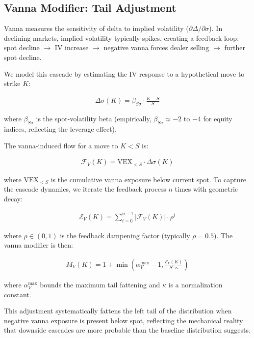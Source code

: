 \documentclass[11pt, a4paper]{article}
\begin{document}
\subsection{Vanna Modifier: Tail Adjustment}

Vanna measures the sensitivity of delta to implied volatility ($\partial \Delta / \partial \sigma$). In declining markets, implied volatility typically spikes, creating a feedback loop: spot decline $\rightarrow$ IV increase $\rightarrow$ negative vanna forces dealer selling $\rightarrow$ further spot decline.

We model this cascade by estimating the IV response to a hypothetical move to strike $K$:

\begin{align}
\Delta\sigma(K) = \beta_{S\sigma} \cdot \frac{K - S}{S}
\end{align}

where $\beta_{S\sigma}$ is the spot-volatility beta (empirically, $\beta_{S\sigma} \approx -2$ to $-4$ for equity indices, reflecting the leverage effect).

The vanna-induced flow for a move to $K < S$ is:

\begin{align}
\mathcal{F}_V(K) = \text{VEX}_{<S} \cdot \Delta\sigma(K)
\end{align}

where $\text{VEX}_{<S}$ is the cumulative vanna exposure below current spot. To capture the cascade dynamics, we iterate the feedback process $n$ times with geometric decay:

\begin{align}
\mathcal{E}_V(K) = \sum_{i=0}^{n-1} |\mathcal{F}_V(K)| \cdot \rho^i
\end{align}

where $\rho \in (0, 1)$ is the feedback dampening factor (typically $\rho = 0.5$). The vanna modifier is then:

\begin{align}
M_V(K) = 1 + \min\left(\alpha_V^{\max} - 1, \frac{\mathcal{E}_V(K)}{S \cdot \kappa}\right)
\end{align}

where $\alpha_V^{\max}$ bounds the maximum tail fattening and $\kappa$ is a normalization constant.

This adjustment systematically fattens the left tail of the distribution when negative vanna exposure is present below spot, reflecting the mechanical reality that downside cascades are more probable than the baseline distribution suggests.
\end{document}
